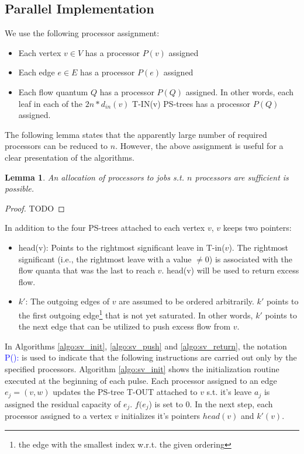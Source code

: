 \documentclass[a4paper,10pt, twocolumn]{article}
\newtheorem{lemma}{Lemma}
\begin{document}
\subsection{Parallel Implementation}
\label{sec:sv_parImpl}
We use the following processor assignment:
\begin{itemize}
	\item Each vertex $v \in V$ has a processor $P(v)$ assigned
	\item Each edge $e \in E$ has a processor $P(e)$ assigned
	\item Each flow quantum $Q$ has a processor $P(Q)$ assigned. In other words, each leaf in each of the $2n * d_{in}(v)$ T-IN(v) PS-trees has a processor $P(Q)$ assigned.
\end{itemize}

The following lemma states that the apparently large number of required processors can be reduced to $n$. However, the above assignment is useful for a clear presentation of the algorithms.

\begin{lemma}
An allocation of processors to jobs s.t. $n$ processors are sufficient is possible. 
\end{lemma}

\begin{proof}
TODO
\end{proof}

In addition to the four PS-trees attached to each vertex $v$, $v$ keeps two pointers:
\begin{itemize}
	\item head(v): Points to the rightmost significant leave in T-in($v$). The rightmost significant (i.e., the rightmost leave with a value $\neq 0$) is associated with the flow quanta that was the last to reach $v$. head(v) will be used to return excess flow. 
	\item $k'$: The outgoing edges of $v$ are assumed to be ordered arbitrarily. $k'$ points to the first outgoing edge\footnote{the edge with the smallest index w.r.t. the given ordering} that is not yet saturated. In other words, $k'$ points to the next edge that can be utilized to push excess flow from $v$.  
\end{itemize}

In Algorithms \ref{algo:sv_init}, \ref{algo:sv_push} and \ref{algo:sv_return}, the notation \textcolor{blue}{P():} is used to indicate that the following instructions are carried out only by the specified processors. Algorithm \ref{algo:sv_init} shows the initialization routine executed at the beginning of each pulse. Each processor assigned to an edge $e_j = (v, w)$ updates the PS-tree T-OUT attached to $v$ s.t. it's leave $a_j$ is assigned the residual capacity of $e_j$. $f(e_j$) is set to 0. In the next step, each processor assigned to a vertex $v$ initializes it's pointers $head(v)$ and $k'(v)$.
\end{document}

